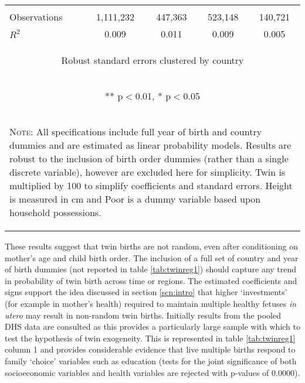 \documentclass{article}[11pt,subeqn]
\begin{document}
\begin{spacing}{1.5}
\begin{table}[ht]
\begin{center}
\begin{tabular}{lcccc}
\vspace{4pt} & \begin{footnotesize}\end{footnotesize} & \begin{footnotesize}\end{footnotesize} & \begin{footnotesize}\end{footnotesize} & \begin{footnotesize}\end{footnotesize} \\
Observations & 1,111,232 & 447,363 & 523,148 & 140,721 \\
 $R^2$ & 0.009 & 0.011 & 0.009 & 0.005 \\
\multicolumn{5}{c}{\begin{footnotesize} Robust standard errors clustered by country \end{footnotesize}} \\
\multicolumn{5}{c}{\begin{footnotesize} ** p$<$0.01, * p$<$0.05 \end{footnotesize}} \\
\bottomrule
\multicolumn{5}{p{10cm}}{\setstretch{0.9}\begin{footnotesize}\textsc{Note:} All specifications include full year of birth and country
dummies and are estimated as linear probability models.  Results are robust to the inclusion of birth order dummies (rather than a single discrete 
variable), however are excluded here for simplicity.  Twin is multiplied by 100 to simplify coefficients and standard errors.  Height is measured
in cm and Poor is a dummy variable based upon household possessions.\end{footnotesize}}\\
\end{tabular}
\end{center}
\end{table}

These results suggest that twin births are not random, even after conditioning on mother's age and child birth order.  The
inclusion of a full set of country and year of birth dummies (not reported in table \ref{tab:twinreg1}) should capture any trend in
probability of twin birth across time or regions.  The estimated coefficients and signs support the idea discussed in section \ref{scn:intro}
that higher `investments' (for example in mother's health) required to maintain multiple healthy fetuses \emph{in utero} may result in 
non-random twin births. 
Initially results from the pooled DHS data are consulted as this provides a particularly large sample with which to test the hypothesis of
twin exogeneity.  This is represented in table \ref{tab:twinreg1} column 1 and provides considerable evidence that live multiple
births respond to family `choice' variables such as education (tests for the joint significance of both socioeconomic variables and health
variables are rejected with p-values of 0.0000).


\end{spacing}
\end{document}
